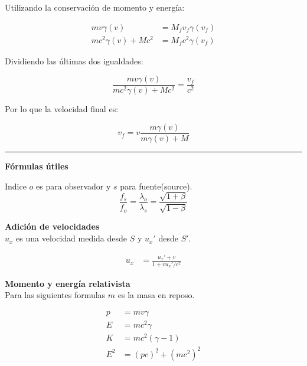\documentclass[12pt]{article}
\begin{document}
Utilizando la conservación de momento y energía:

\begin{align*}
 mv\gamma(v) &= M_f v_f\gamma(v_f)\\
 mc^2\gamma(v) + Mc^2& = M_fc^2\gamma(v_f) 
\end{align*}

Dividiendo las últimas dos igualdades:

\begin{equation}
\frac{ mv\gamma(v)}{mc^2\gamma(v) + Mc^2} = \frac{v_f}{c^2}
\end{equation}


Por lo que la velocidad final es:

\begin{equation}
v_f = v \frac{m\gamma(v)}{m\gamma(v) + M}
\end{equation}
\noindent\rule{16.5cm}{0.4pt}


\textbf{Fórmulas útiles}

Indice $o$ es para observador y $s$ para fuente(source).
\begin{equation*}
\frac{f_s}{f_o} = \frac{\lambda_o}{\lambda_s} = \frac{\sqrt{1+\beta}}{\sqrt{1-\beta}}
\end{equation*}


\textbf{Adición de velocidades}\\
$u_x$ es una velocidad medida desde $S$ y $u_x'$ desde $S'$. 

\begin{align*}
u_x &= \frac{u_x'+v}{1+vu_x'/c^2}
\end{align*}

\textbf{Momento y energía relativista}\\

Para las siguientes formulas $m$ es la masa en reposo.

\begin{align*}
p &= m  v \gamma\\
E &= m c^2\gamma\\
K &=  m  c^2 (\gamma-1)\\
E^2 &= (pc)^2 + (mc^2)^2
\end{align*}
\end{document}
